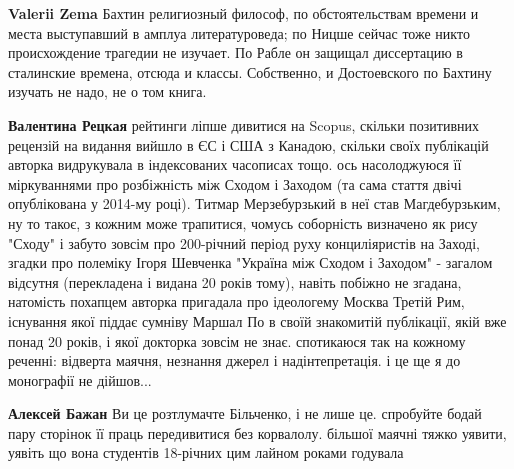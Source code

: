 \begin{itemize}
\begin{itemize}
 
\textbf{Valerii Zema} Бахтин религиозный философ, по обстоятельствам времени и места выступавший в амплуа литературоведа; по Ницше сейчас тоже никто происхождение трагедии не изучает. По Рабле он защищал диссертацию в сталинские времена, отсюда и классы. Собственно, и Достоевского по Бахтину изучать не надо, не о том книга.

 
\textbf{Валентина Рецкая} рейтинги ліпше дивитися на Scopus, скільки позитивних
рецензій на видання вийшло в ЄС і США з Канадою, скільки своїх публікацій
авторка видрукувала в індексованих часописах тощо. ось насолоджуюся її
міркуваннями про розбіжність між Сходом і Заходом (та сама стаття двічі
опублікована у 2014-му році). Титмар Мерзебурзький в неї став Магдебурзьким, ну
то такоє, з кожним може трапитися, чомусь соборність визначено як рису "Сходу"
і забуто зовсім про 200-річний період руху конциліяристів на Заході, згадки про
полеміку Ігоря Шевченка "Україна між Сходом і Заходом" - загалом відсутня
(перекладена і видана 20 років тому), навіть побіжно не згадана, натомість
похапцем авторка пригадала про ідеологему Москва Третій Рим, існування якої
піддає сумніву Маршал По в своїй знакомитій публікації, якій вже понад 20
років, і якої докторка зовсім не знає. спотикаюся так на кожному реченні:
відверта маячня, незнання джерел і надінтепретація. і це ще я до монографії не
дійшов...

 
\textbf{Алексей Бажан} Ви це розтлумачте Більченко, і не лише це. спробуйте бодай пару сторінок її праць передивитися без корвалолу. більшої маячні тяжко уявити, уявіть що вона студентів 18-річних цим лайном роками годувала

 

\end{itemize}
\end{itemize}
